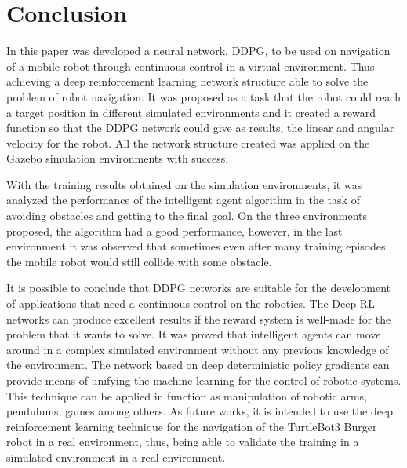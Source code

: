\section{Conclusion}

In this paper was developed a neural network, DDPG, to be used on navigation of a mobile robot through continuous control in a virtual environment.
Thus achieving a deep reinforcement learning network structure able to solve the problem of robot navigation.
It was proposed as a task that the robot could reach a target position in different simulated environments and it created a reward function so that the DDPG network could give as results, the linear and angular velocity for the robot. All the network structure created was applied on the Gazebo simulation environments with success.

With the training results obtained on the simulation environments, it was analyzed the performance of the intelligent agent algorithm in the task of avoiding obstacles and getting to the final goal. 
On the three environments proposed, the algorithm had a good performance, however, in the last environment it was observed that sometimes even after many training episodes the mobile robot would still collide with some obstacle.

It is possible to conclude that DDPG networks are suitable for the development of applications that need a continuous control on the robotics.
The Deep-RL networks can produce excellent results if the reward system is well-made for the problem that it wants to solve.
It was proved that intelligent agents can move around in a complex simulated environment without any previous knowledge of the environment.
The network based on deep deterministic policy gradients can provide means of unifying the machine learning for the control of robotic systems.
This technique can be applied in function as manipulation of robotic arms, pendulums, games among others.
As future works, it is intended to use the deep reinforcement learning technique for the navigation of the TurtleBot3 Burger robot in a real environment, thus, being able to validate the training in a simulated environment in a real environment.
